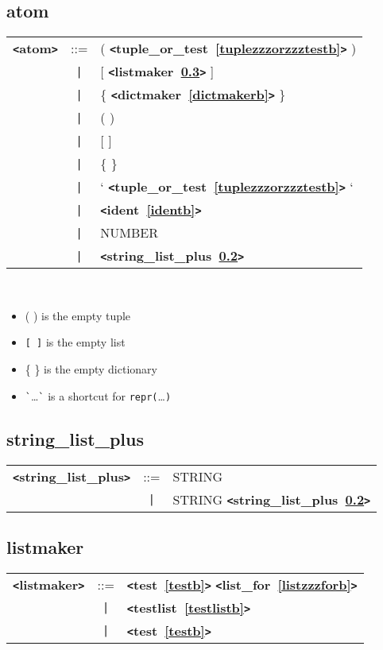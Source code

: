 \documentclass[12pt]{article}
\begin{document}
\subsection{atom}
\label{atomb}
\begin{tabular}{lcl}
{\bf \verb+<+atom\verb+>+} & ::=  & ( {\bf \verb+<+tuple\_or\_test~\ref{tuplezzzorzzztestb}\verb+>+}  ) \\
 & \verb+|+  & [ {\bf \verb+<+listmaker~\ref{listmakerb}\verb+>+}  ] \\
 & \verb+|+  & \{ {\bf \verb+<+dictmaker~\ref{dictmakerb}\verb+>+}  \} \\
 & \verb+|+  & ( ) \\
 & \verb+|+  & [ ] \\
 & \verb+|+  & \{ \} \\
 & \verb+|+  & ` {\bf \verb+<+tuple\_or\_test~\ref{tuplezzzorzzztestb}\verb+>+}  ` \\
 & \verb+|+  & {\bf \verb+<+ident~\ref{identb}\verb+>+}  \\
 & \verb+|+  & NUMBER \\
 & \verb+|+  & {\bf \verb+<+string\_list\_plus~\ref{stringzzzlistzzzplusb}\verb+>+}  \\
\end{tabular} \\

\begin{itemize}
\item ( ) is the empty tuple
\item \verb|[ ]| is the empty list
\item \{ \} is the empty dictionary
\item \verb|`|\ldots\verb|`| is a shortcut for \verb|repr(|\ldots\verb|)|
\end{itemize}

\subsection{string\_list\_plus}
\label{stringzzzlistzzzplusb}
\begin{tabular}{lcl}
{\bf \verb+<+string\_list\_plus\verb+>+} & ::=  & STRING \\
 & \verb+|+  & STRING {\bf \verb+<+string\_list\_plus~\ref{stringzzzlistzzzplusb}\verb+>+}  \\
\end{tabular}

\subsection{listmaker}
\label{listmakerb}
\begin{tabular}{lcl}
{\bf \verb+<+listmaker\verb+>+} & ::=  & {\bf \verb+<+test~\ref{testb}\verb+>+}  {\bf \verb+<+list\_for~\ref{listzzzforb}\verb+>+}  \\
 & \verb+|+  & {\bf \verb+<+testlist~\ref{testlistb}\verb+>+}  \\
 & \verb+|+  & {\bf \verb+<+test~\ref{testb}\verb+>+}  \\
\end{tabular}
\end{document}
